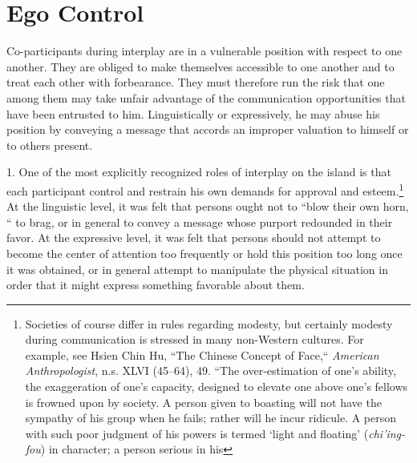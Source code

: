 \documentclass[openany,nobib]{tufte-book}
\begin{document}
\hypertarget{ego-control}{%
\section{Ego Control}\label{ego-control}}

Co-participants during interplay are in a vulnerable position with
respect to one another. They are obliged to make themselves accessible
to one another and to treat each other with forbearance. They must
therefore run the risk that one among them may take unfair advantage of
the communication opportunities that have been entrusted to him.
Linguistically or expressively, he may abuse his position by conveying a
message that accords an improper valuation to himself or to others
present.

1. One of the most explicitly recognized roles of interplay on the
island is that each participant control and restrain his own demands for
approval and esteem.\footnote{Societies of course differ in rules
  regarding modesty, but certainly modesty during communication is
  stressed in many non-Western cultures. For example, see Hsien Chin Hu,
  ``The Chinese Concept of Face,`` \emph{American Anthropologist}, n.s.
  XLVI (45--64), 49. ``The over-estimation of one's ability, the
  exaggeration of one's capacity, designed to elevate one above one's
  fellows is frowned upon by society. A person given to boasting will
  not have the sympathy of his group when he fails; rather will he incur
  ridicule. A person with such poor judgment of his powers is termed
  `light and floating' (\emph{chi'ing-fou}) in character; a person
  serious in his} At the
linguistic level, it was felt that persons ought not to ``blow their own
horn, `` to brag, or in general to convey a message whose purport
redounded in their favor. At the expressive level, it was felt that
persons should not attempt to become the center of attention too
frequently or hold this position too long once it was obtained, or in
general attempt to manipulate the physical situation in order that it
might express something favorable about them.
\end{document}
